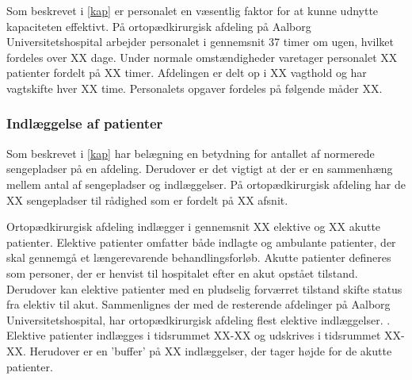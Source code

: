 Som beskrevet i \ref{kap} er personalet en væsentlig faktor for at kunne udnytte kapaciteten effektivt. På ortopædkirurgisk afdeling på Aalborg Universitetshospital arbejder personalet i gennemsnit 37 timer om ugen, hvilket fordeles over XX dage. \cite{Danske2015} Under normale omstændigheder varetager personalet XX patienter fordelt på XX timer. Afdelingen er delt op i XX vagthold og har vagtskifte hver XX time. Personalets opgaver fordeles på følgende måder XX. 

\subsubsection{Indlæggelse af patienter}

Som beskrevet i \ref{kap} har belægning en betydning for antallet af normerede sengepladser på en afdeling. Derudover er det vigtigt at der er en sammenhæng mellem antal af sengepladser og indlæggelser. På ortopædkirurgisk afdeling har de XX sengepladser til rådighed som er fordelt på XX afsnit. 

Ortopædkirurgisk afdeling indlægger i gennemsnit XX elektive og XX akutte patienter. Elektive patienter omfatter både indlagte og ambulante patienter, der skal gennemgå et længerevarende behandlingsforløb. Akutte patienter defineres som personer, der er henvist til hospitalet efter en akut opstået tilstand. Derudover kan elektive patienter med en pludselig forværret tilstand skifte status fra elektiv til akut.
Sammenlignes der med de resterende afdelinger på Aalborg Universitetshospital, har ortopædkirurgisk afdeling flest elektive indlæggelser. \cite{RegionNord2016}. Elektive patienter indlægges i tidsrummet XX-XX og udskrives i tidsrummet XX-XX. Herudover er en 'buffer' på XX indlæggelser, der tager højde for de akutte patienter. 